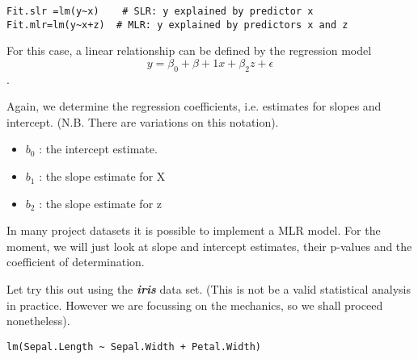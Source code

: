 \begin{framed}
\begin{verbatim}
Fit.slr =lm(y~x)  	# SLR: y explained by predictor x
Fit.mlr=lm(y~x+z)  # MLR: y explained by predictors x and z
\end{verbatim}
\end{framed}

For this case, a  linear relationship can be defined by the regression model  \[y =\beta_0 + \beta+1x + \beta_2z + \epsilon\].

Again, we determine the regression coefficients, i.e. estimates for slopes and intercept. (N.B. There are variations on this notation).

\begin{itemize}
\item	$b_0$ : the intercept estimate.
\item	$b_1$  : the slope estimate for X
\item	$b_2$  : the slope estimate for z
\end{itemize}

In many project datasets it is possible to implement a MLR model. For the moment, we will just look at slope and intercept estimates, their p-values and the coefficient of determination.

Let try this out using the \textbf{\textit{iris}} data set. (This is not be a valid statistical analysis in practice. However we are focussing on the mechanics, so we shall proceed nonetheless).
\begin{framed}
\begin{verbatim}
lm(Sepal.Length ~ Sepal.Width + Petal.Width)
\end{verbatim}
\end{framed}



 
